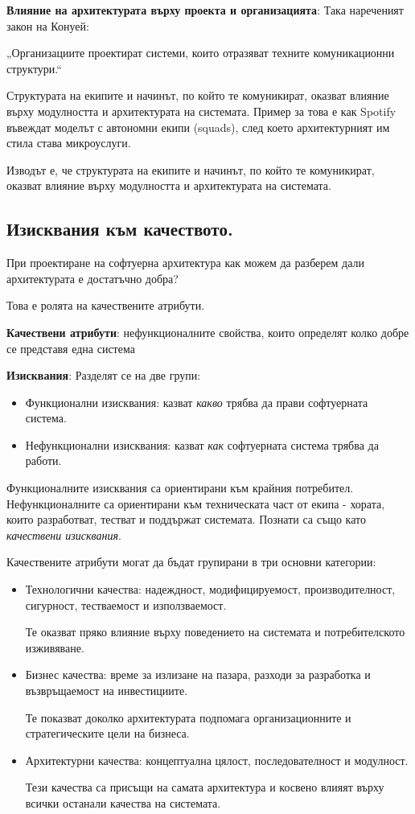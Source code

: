 \documentclass{article}
\renewcommand{\\}{\newline}
\begin{document}
\textbf{Влияние на архитектурата върху проекта и организацията}: Така нареченият закон на Конуей: 

„Организациите проектират системи, които отразяват техните комуникационни структури.“

Структурата на екипите и начинът, по който те комуникират, оказват влияние върху модулността и архитектурата на системата. Пример за това е как Spotify въвеждат моделът с автономни екипи (squads), след което архитектурният им стила става микроуслуги.

Изводът е, че структурата на екипите и начинът, по който те комуникират, оказват влияние върху модулността и архитектурата на системата.

\subsection{Изисквания към качеството.}

При проектиране на софтуерна архитектура как можем да разберем дали архитектурата е достатъчно добра?

Това е ролята на качествените атрибути.

\textbf{Качествени атрибути}: нефункционалните свойства, които определят колко добре се представя една система

\textbf{Изисквания}: Разделят се на две групи:
\begin{itemize}
    \item Функционални изисквания: казват \textit{какво} трябва да прави софтуерната система.
    \item Нефункционални изисквания: казват \textit{как} софтуерната система трябва да работи.
\end{itemize}

Функционалните изисквания са ориентирани към крайния потребител. Нефункционалните са ориентирани към техническата част от екипа - хората, които разработват, тестват и поддържат системата. Познати са също като \textit{качествени изисквания}.

Качествените атрибути могат да бъдат групирани в три основни категории:

\begin{itemize}
    \item Технологични качества: надеждност, модифицируемост, производителност, сигурност, тестваемост и използваемост.

      Те оказват пряко влияние върху поведението на системата и потребителското изживяване.

    \item Бизнес качества: време за излизане на пазара, разходи за разработка и възвръщаемост на инвестициите. 

  Те показват доколко архитектурата подпомага организационните и стратегическите цели на бизнеса.

   \item Архитектурни качества: концептуална цялост, последователност и модулност. 

     Тези качества са присъщи на самата архитектура и косвено влияят върху всички останали качества на системата.
\end{itemize}
\end{document}
